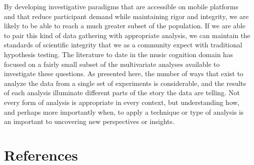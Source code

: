 \documentclass[
  english,
  man,floatsintext]{apa6}
\begin{document}
By developing investigative paradigms that are accessible on mobile platforms and that reduce participant demand while maintaining rigor and integrity, we are likely to be able to reach a much greater subset of the population. If we are able to pair this kind of data gathering with appropriate analysis, we can maintain the standards of scientific integrity that we as a community expect with traditional hypothesis testing. The literature to date in the music cognition domain has focused on a fairly small subset of the multivariate analyses available to investigate these questions. As presented here, the number of ways that exist to analyze the data from a single set of experiments is considerable, and the results of each analysis illuminate different parts of the story the data are telling. Not every form of analysis is appropriate in every context, but understanding how, and perhaps more importantly when, to apply a technique or type of analysis is an important to uncovering new perspectives or insights.

\newpage

\hypertarget{references}{%
\section{References}\label{references}}

\begingroup
\setlength{\parindent}{-0.5in}
\setlength{\leftskip}{0.5in}
\end{document}
